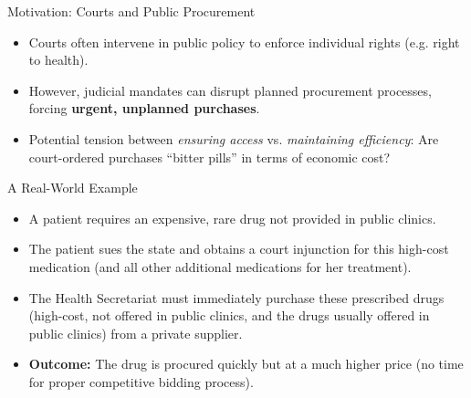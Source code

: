 \documentclass[aspectratio=169]{beamer}
\begin{document}
\begin{frame}{Motivation: Courts and Public Procurement}
  \begin{itemize}
    \item Courts often intervene in public policy to enforce individual rights (e.g. right to health).
    \item However, judicial mandates can disrupt planned procurement processes, forcing \textbf{urgent, unplanned purchases}.
    \item Potential tension between \textit{ensuring access} vs. \textit{maintaining efficiency}: Are court-ordered purchases ``bitter pills'' in terms of economic cost?
  \end{itemize}
\end{frame}

\begin{frame}{A Real-World Example}
  \begin{itemize}
    \item A patient requires an expensive, rare drug not provided in public clinics.
    \item The patient sues the state and obtains a court injunction for this high-cost medication (and all other additional medications for her treatment).
    \item The Health Secretariat must immediately purchase these prescribed drugs (high-cost, not offered in public clinics, and the drugs usually offered in public clinics) from a private supplier.
    \item \textbf{Outcome:} The drug is procured quickly but at a much higher price (no time for proper competitive bidding process).
  \end{itemize}
\end{frame}
\end{document}
